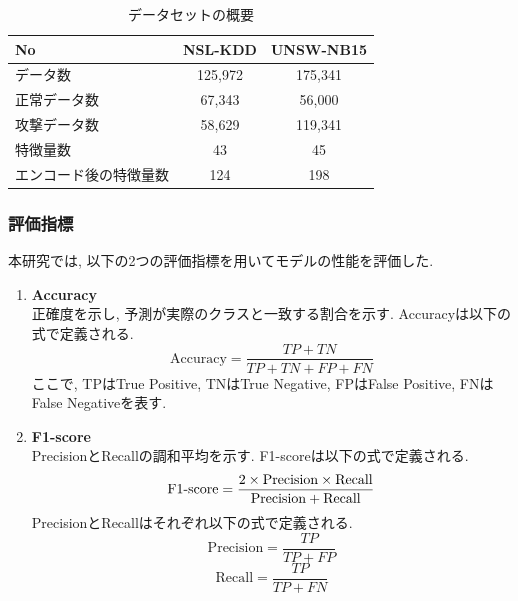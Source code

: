 \documentclass{css}
\begin{document}
\begin{table}[h]
    \centering
    \caption{データセットの概要}\label{tab:data1}
    \begin{tabular}{lcc}
    \hline\hline
    No & NSL-KDD & UNSW-NB15 \\
    \hline
    データ数 & 125,972 & 175,341 \\
    正常データ数 & 67,343 & 56,000 \\
    攻撃データ数 & 58,629 & 119,341 \\
    特徴量数 & 43 & 45 \\
    エンコード後の特徴量数 & 124 & 198 \\
    \hline
    \end{tabular}
\end{table}

\subsubsection{評価指標}
本研究では, 以下の2つの評価指標を用いてモデルの性能を評価した. 

\begin{enumerate}
    \item \textbf{Accuracy}\\
        正確度を示し, 予測が実際のクラスと一致する割合を示す. Accuracyは以下の式で定義される. 
        \begin{equation}
            \mathrm{Accuracy} = \frac{TP + TN}{TP + TN + FP + FN}
        \end{equation}
        ここで, TPはTrue Positive, TNはTrue Negative, FPはFalse Positive, FNはFalse Negativeを表す. 
    
    \item \textbf{F1-score}\\
        PrecisionとRecallの調和平均を示す. F1-scoreは以下の式で定義される. 
        \begin{equation}
            \mathrm{F1\mathchar`-score} = \frac{2 \times \mathrm{Precision} \times \mathrm{Recall}}{\mathrm{Precision} + \mathrm{Recall}}
        \end{equation}
        PrecisionとRecallはそれぞれ以下の式で定義される. 
        \begin{equation}
            \mathrm{Precision} = \frac{TP}{TP + FP}
        \end{equation}
        \begin{equation}
            \mathrm{Recall} = \frac{TP}{TP + FN}
        \end{equation}
\end{enumerate}
\end{document}
